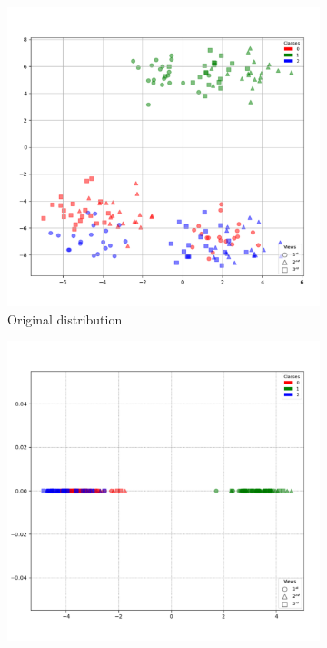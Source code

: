         \begin{figure}[htbp]
            \centering
            \begin{subfigure}{0.33\textwidth}
                \centering
                \includegraphics[width=0.95\linewidth]{figs/Synthetic1_original.png}
                \caption{Original distribution}
            \end{subfigure}%
            \begin{subfigure}{0.33\textwidth}
                \centering
                \includegraphics[width=0.95\linewidth]{figs/Synthetic1_MvDA.png}

\end{subfigure}
\end{figure}
